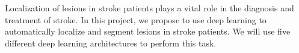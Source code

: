 Localization of lesions in stroke patients plays a vital role
in the diagnosis and treatment of stroke. In this project, we
propose to use deep learning to automatically localize and
segment lesions in stroke patients. We will use five different
deep learning architectures to perform this task. 